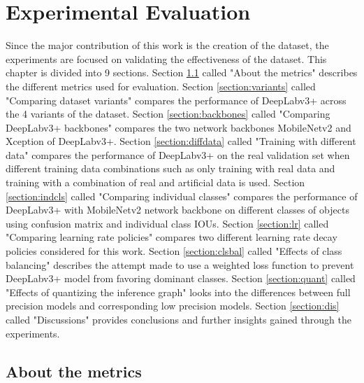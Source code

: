 
\chapter{Experimental Evaluation}

Since the major contribution of this work is the creation of the dataset, the experiments are focused on validating the effectiveness of the dataset. This chapter is divided into 9 sections. Section \ref{section:metrics} called "About the metrics" describes the different metrics used for evaluation. Section \ref{section:variants} called "Comparing dataset variants" compares the performance of DeepLabv3+ across the 4 variants of the dataset. Section \ref{section:backbones} called "Comparing DeepLabv3+ backbones" compares the two network backbones MobileNetv2 and Xception of DeepLabv3+. Section \ref{section:diffdata} called "Training with different data" compares the performance of DeepLabv3+ on the real validation set when different training data combinations such as only training with real data and training with a combination of real and artificial data is used. Section \ref{section:indcls} called "Comparing individual classes" compares the performance of DeepLabv3+ with MobileNetv2 network backbone on different classes of objects using confusion matrix and individual class IOUs. Section \ref{section:lr} called "Comparing learning rate policies" compares two different learning rate decay policies considered for this work. Section \ref{section:clsbal} called "Effects of class balancing" describes the attempt made to use a weighted loss function to prevent DeepLabv3+ model from favoring dominant classes. Section \ref{section:quant} called "Effects of quantizing the inference graph" looks into the differences between full precision models and corresponding low precision models. Section \ref{section:dis} called "Discussions" provides conclusions and further insights gained through the experiments. 


\section{About the metrics}
\label{section:metrics}

